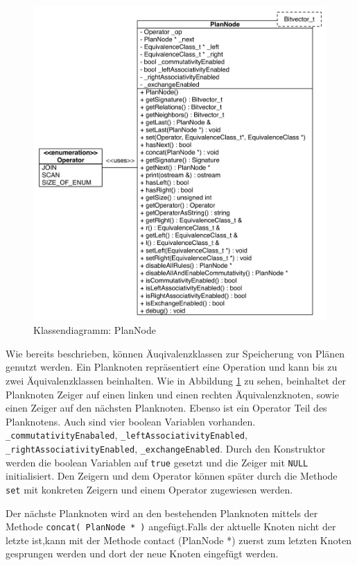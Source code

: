 \begin{figure}[ht]
  \centering
  \includegraphics[width=\textwidth]{04_Implementierung/00_media/PlanNodeClass.pdf}
  \caption{Klassendiagramm: PlanNode}
  \label{PlanNodeClass}
\end{figure}

Wie bereits beschrieben, können Äuqivalenzklassen zur Speicherung von Plänen genutzt werden. Ein Planknoten repräsentiert eine Operation und kann bis zu zwei Äquivalenzklassen beinhalten. Wie in Abbildung \ref{PlanNodeClass} zu sehen, beinhaltet der Planknoten Zeiger auf einen linken und einen rechten Äquivalenzknoten, sowie einen Zeiger auf den nächsten Planknoten. Ebenso ist ein Operator Teil des Planknotens. Auch sind vier boolean Variablen vorhanden. \texttt{\_commutativity\-Enabaled}, \texttt{\_left\-Associativity\-Enabled},  \texttt{\_right\-Associativity\-Enabled},  \texttt{\_exchange\-Enabled}. Durch den Konstruktor werden die boolean Variablen auf \texttt{true} gesetzt und die Zeiger mit \texttt{NULL} initialisiert. Den Zeigern und dem Operator können später durch die Methode \texttt{set} mit konkreten Zeigern und einem Operator zugewiesen werden.



Der nächste Planknoten wird an den bestehenden Planknoten mittels der Methode \texttt{concat( PlanNode * )} angefügt.Falls der aktuelle Knoten nicht der letzte ist,kann mit der Methode contact (PlanNode *) zuerst zum letzten Knoten gesprungen werden und dort der neue Knoten eingefügt werden. 

